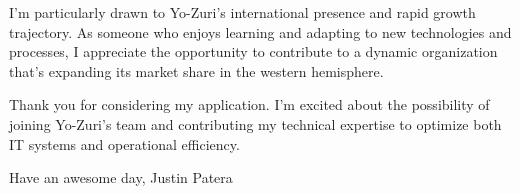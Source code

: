 \smallskip

I'm particularly drawn to Yo-Zuri's international presence and rapid growth trajectory.
As someone who enjoys learning and adapting to new technologies and processes, I appreciate the opportunity to contribute to a dynamic organization that's expanding its market share in the western hemisphere.

\smallskip

Thank you for considering my application.
I'm excited about the possibility of joining Yo-Zuri's team and contributing my technical expertise to optimize both IT systems and operational efficiency.

\smallskip

Have an awesome day,
Justin Patera
